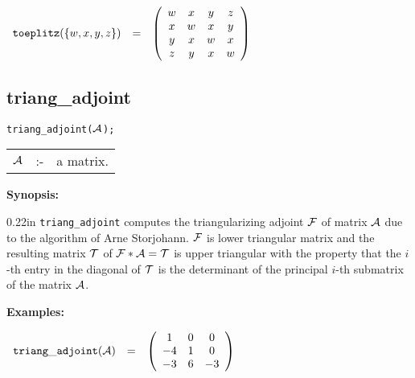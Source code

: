 \begin{flushleft}  
\hspace*{0.1in}
\begin{math}  
\begin{array}{ccc}
{\tt toeplitz}(\{w,x,y,z\}) & = & 
        \left( \begin{array}{cccc} w & x & y & z \\ x & w & x & y \\
      y & x & w & x \\ z & y & x & w
 \end{array} \right) 
\end{array}
\end{math}  
\end{flushleft}

\subsection{triang\_adjoint}

\hspace*{0.175in} {\tt triang\_adjoint(${\cal A}$);}

\hspace*{0.1in}
\begin{tabular}{l l l}
${\cal A}$  &:-& a matrix.
\end{tabular}

{\bf Synopsis:} %


\begin{addtolength}{\leftskip}{0.22in}
{\tt triang\_adjoint} computes the triangularizing adjoint ${\cal F}$ of
matrix ${\cal A}$ due to the algorithm of Arne Storjohann. ${\cal F}$ is
lower triangular matrix and the resulting matrix ${\cal T}$ of
${\cal F * A = T}$ is upper triangular with the property that the $i$-th
entry in the diagonal of ${\cal T}$ is the determinant of the principal
$i$-th submatrix of the matrix ${\cal A}$.

\end{addtolength}

{\bf Examples:}

\begin{flushleft}
\hspace*{0.1in}
\begin{math}
\begin{array}{ccc}
{\tt triang\_adjoint}({\cal A}) & = &
\left( \begin{array}{ccc} 1 & 0 & 0 \\ -4 & 1 & 0 \\ -3 & 6 & -3
\end{array} \right)
\end{array}
\end{math}
\end{flushleft}

